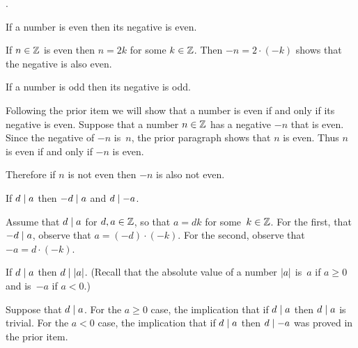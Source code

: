\documentclass{ibl}  %
\begin{document}
\begin{problem}  
\label{ex:InteractionOfParityWithSign}
\pord.
\begin{exes}
  \begin{exercise}
    If a number is even then its negative is even.
  \end{exercise}
  \begin{answer}
    If $n\in\mathbb{Z}$ is even then $n=2k$ for some $k\in\mathbb{Z}$.
    Then $-n=2\cdot(-k)$ shows that the negative is also even.  
  \end{answer}
  \begin{exercise}
    If a number is odd then its negative is odd.
  \end{exercise}
  \begin{answer}
    Following the prior item we will show that a number is even
    if and only if its negative is even.
    Suppose that a number $n\in\mathbb{Z}$ has a negative $-n$ that is even.
    Since the negative of $-n$ is~$n$, the prior paragraph 
    shows that $n$ is even.
    Thus $n$ is even if and only if $-n$ is even.

    Therefore
    if $n$ is not even then $-n$ is also not even.
  \end{answer}
  \begin{exercise}
    If $d\mid a$ then $-d\mid a$ and $d\mid -a$.
  \end{exercise}
  \begin{answer}
    Assume that $d\mid a$ for $d,a\in\mathbb{Z}$, so that 
    $a=dk$ for some~$k\in\mathbb{Z}$.
    For the first, that $-d\mid a$, observe that
    $a=(-d)\cdot(-k)$.
    For the second, observe that $-a=d\cdot(-k)$.
  \end{answer}
  \begin{exercise}
    If $d\mid a$ then $d\mid\lvert a\rvert$.
    (Recall that the absolute value of a number $\lvert a\rvert$ is~$a$ 
    if $a\geq 0$ and is~$-a$ if $a<0$.)
  \end{exercise}
  \begin{answer}
    Suppose that $d\mid a$.
    For the $a\geq 0$ case, the implication that if $d\mid a$ then 
    $d\mid a$ is trivial.
    For the $a<0$ case, 
    the implication that if $d\mid a$ then $d\mid -a$ was
    proved in the prior item.    
  \end{answer}
\end{exes}  
\end{problem}
\end{document}
